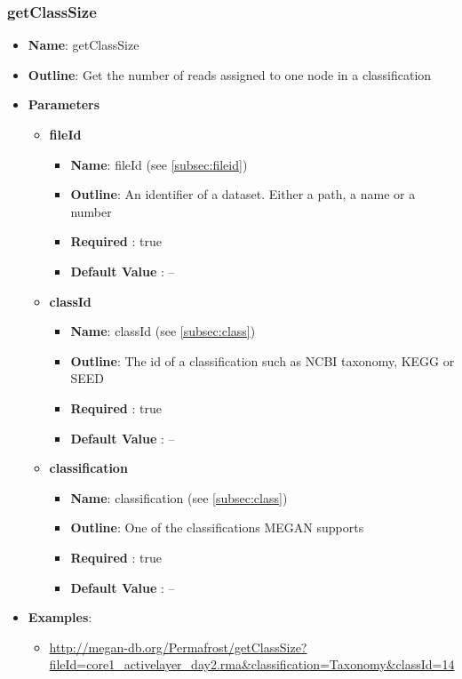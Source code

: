 \documentclass[11pt]{article}
\begin{document}
\subsubsection{getClassSize}
\begin{itemize}
	\item \textbf{Name}: getClassSize
	\item \textbf{Outline}: Get the number of reads assigned to one node in a classification
	\item \textbf{Parameters}
		\begin{itemize}
			\item \textbf{fileId}
				\begin{itemize}
					\item \textbf{Name}: fileId (see \ref{subsec:fileid})
					\item \textbf{Outline}: An identifier of a dataset. Either a path, a name or a number
					\item \textbf{Required} : true
					\item \textbf{Default Value} : --
				\end{itemize}
			\item \textbf{classId}
				\begin{itemize}
					\item \textbf{Name}: classId (see \ref{subsec:class})
					\item \textbf{Outline}: The id of a classification such as NCBI taxonomy, KEGG or SEED
					\item \textbf{Required} : true
					\item \textbf{Default Value} : --
				\end{itemize}
			\item \textbf{classification}
				\begin{itemize}
					\item \textbf{Name}: classification (see \ref{subsec:class})
					\item \textbf{Outline}: One of the classifications MEGAN supports
					\item \textbf{Required} : true
					\item \textbf{Default Value} : --
				\end{itemize}
		\end{itemize}
	\item \textbf{Examples}:
		\begin{itemize}
			\item \url{http://megan-db.org/Permafrost/getClassSize?fileId=core1_activelayer_day2.rma&classification=Taxonomy&classId=14}
		\end{itemize}
\end{itemize}
\end{document}
